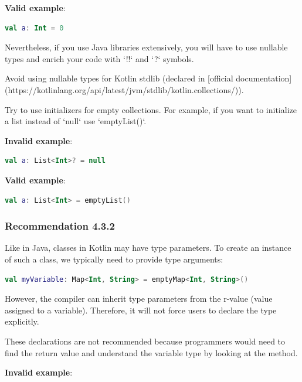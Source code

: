 {{{{\textbf{Valid example}:

\begin{lstlisting}[language=Kotlin]
val a: Int = 0
\end{lstlisting}


Nevertheless, if you use Java libraries extensively, you will have to use nullable types and enrich your code with `!!` and `?` symbols.

Avoid using nullable types for Kotlin stdlib (declared in [official documentation](https://kotlinlang.org/api/latest/jvm/stdlib/kotlin.collections/)).

Try to use initializers for empty collections. For example, if you want to initialize a list instead of `null` use `emptyList()`.



\textbf{Invalid example}:

\begin{lstlisting}[language=Kotlin]
val a: List<Int>? = null
\end{lstlisting}


\textbf{Valid example}:

\begin{lstlisting}[language=Kotlin]
val a: List<Int> = emptyList()
\end{lstlisting}


\subsubsection*{\textbf{Recommendation 4.3.2}}
\leavevmode\newline

Like in Java, classes in Kotlin may have type parameters. To create an instance of such a class, we typically need to provide type arguments:



\begin{lstlisting}[language=Kotlin]
val myVariable: Map<Int, String> = emptyMap<Int, String>()
\end{lstlisting}


However, the compiler can inherit type parameters from the r-value (value assigned to a variable). Therefore, it will not force users to declare the type explicitly.

These declarations are not recommended because programmers would need to find the return value and understand the variable type by looking at the method.



\textbf{Invalid example}:

}}}}
